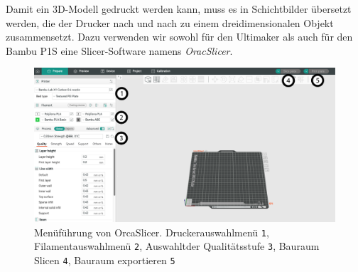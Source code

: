 \documentclass{\basedir/fablab-document}
\begin{document}
Damit ein 3D-Modell gedruckt werden kann, muss es in Schichtbilder übersetzt werden, die der Drucker nach und nach zu einem dreidimensionalen Objekt zusammensetzt. Dazu verwenden wir sowohl für den Ultimaker als auch für den Bambu P1S eine Slicer-Software namens \textit{OracSlicer}.

\vspace{2em}

\begin{figure} [H]
	\centering
	\includegraphics[width=1.0\textwidth]{./zeichnungen/OrcaSlicer.pdf}
	\caption{Menüführung von OrcaSlicer. Druckerauswahlmenü \large\textcircled{\normalsize \texttt{1}}, Filamentauswahlmenü \large\textcircled{\normalsize \texttt{2}}, Auswahltder Qualitätsstufe \large\textcircled{\normalsize \texttt{3}}, Bauraum Slicen \large\textcircled{\normalsize \texttt{4}}, Bauraum exportieren \large\textcircled{\normalsize \texttt{5}} }
	\label{abb.Grafik1}
\end{figure}

\vspace{2em}
\end{document}
